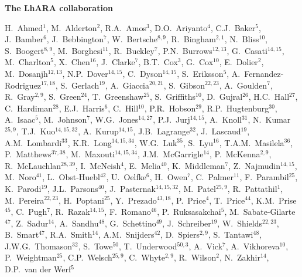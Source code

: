 \vspace{0.75cm}
\begin{center}
  {\bf \color{BlueViolet} The LhARA collaboration} \\
  \vspace{0.25cm}
\end{center}
\begin{center}
  H.~Ahmed$^{1}$,
  M.~Alderton$^{2}$,
  R.A.~Amos$^{3}$,
  D.O.~Ariyanto$^{4}$,
  C.J.~Baker$^{5}$,
  J.~Bamber$^{6}$,
  J.~Bebbington$^{7}$,
  W.~Bertsche$^{8,9}$,
  R.~Bingham$^{2,1}$,
  N.~Bliss$^{10}$,
  S.~Boogert$^{8,9}$,
  M.~Borghesi$^{11}$,
  R.~Buckley$^{7}$,
  P.N.~Burrows$^{12,13}$,
  G.~Casati$^{14,15}$,
  M.~Charlton$^{5}$,
  X.~Chen$^{16}$,
  J.~Clarke$^{7}$,
  B.T.~Cox$^{3}$,
  G.~Cox$^{10}$,
  E.~Dolier$^{2}$,
  M.~Dosanjh$^{12,13}$,
  N.P.~Dover$^{14,15}$,
  C.~Dyson$^{14,15}$,
  S.~Eriksson$^{5}$,
  A.~Fernandez-Rodriguez$^{17,18}$,
  S.~Gerlach$^{19}$,
  A.~Giaccia$^{20,21}$,
  S.~Gibson$^{22,23}$,
  A.~Goulden$^{7}$,
  R.~Gray$^{2,9}$,
  S.~Green$^{24}$,
  T.~Greenshaw$^{25}$,
  S.~Griffiths$^{10}$,
  D.~Gujral$^{26}$,
  H.C.~Hall$^{27}$,
  C.~Hardiman$^{28}$,
  E.J.~Harris$^{6}$,
  C.~Hill$^{10}$,
  P.R.~Hobson$^{29}$,
  R.P.~Hugtenburg$^{30}$,
  A.~Isaac$^{5}$,
  M.~Johnson$^{7}$,
  W.G.~Jones$^{14,27}$,
  P.J.~Jurj$^{14,15}$,
  A.~Knoll$^{31}$,
  N.~Kumar$^{25,9}$,
  T.J.~Kuo$^{14,15,32}$,
  A.~Kurup$^{14,15}$,
  J.B.~Lagrange$^{32}$,
  J.~Lascaud$^{19}$,
  A.M.~Lombardi$^{33}$,
  K.R.~Long$^{14,15,34}$,
  W.G.~Luk$^{35}$,
  S.~Lyu$^{16}$,
  T.A.M.~Masilela$^{36}$,
  P.~Matthews$^{37,38}$,
  M.~Maxouti$^{14,15,34}$,
  J.M.~McGarrigle$^{14}$,
  P.~McKenna$^{2,9}$,
  R.~McLauchlan$^{28,39}$,
  I.~McNeish$^{4}$,
  E.~Melia$^{40}$,
  K.~Middleman$^{7}$,
  Z.~Najmudin$^{14,15}$,
  M.~Noro$^{41}$,
  L.~Obst-Huebl$^{42}$,
  U.~Oelfke$^{6}$,
  H.~Owen$^{7}$,
  C.~Palmer$^{11}$,
  F.~Parambil$^{25}$,
  K.~Parodi$^{19}$,
  J.L.~Parsons$^{40}$,
  J.~Pasternak$^{14,15,32}$,
  M.~Patel$^{25,9}$,
  R.~Pattathil$^{1}$,
  M.~Pereira$^{22,23}$,
  H.~Poptani$^{25}$,
  Y.~Prezado$^{43,18}$,
  P.~Price$^{4}$,
  T.~Price$^{44}$,
  K.M.~Prise$^{45}$,
  C.~Pugh$^{7}$,
  R.~Razak$^{14,15}$,
  F.~Romano$^{46}$,
  P.~Ruksasakchai$^{5}$,
  M.~Sabate-Gilarte$^{47}$,
  Z.~Sadur$^{14}$,
  A.~Sandhu$^{48}$,
  G.~Schettino$^{49}$,
  J.~Schreiber$^{19}$,
  W.~Shields$^{22,23}$,
  B.~Smart$^{47}$,
  R.A.~Smith$^{14}$,
  A.M.~Snijders$^{42}$,
  D.~Spiers$^{2,9}$,
  S.~Tantawi$^{48}$,
  J.W.G.~Thomason$^{32}$,
  S.~Towe$^{50}$,
  T.~Underwood$^{50,3}$,
  A.~Vick$^{7}$,
  A.~Vikhoreva$^{10}$,
  P.~Weightman$^{25}$,
  C.P.~Welsch$^{25,9}$,
  C.~Whyte$^{2,9}$,
  R.~Wilson$^{2}$,
  N.~Zakhir$^{14}$,
  D.P.~van der Werf$^{5}$
\end{center}
